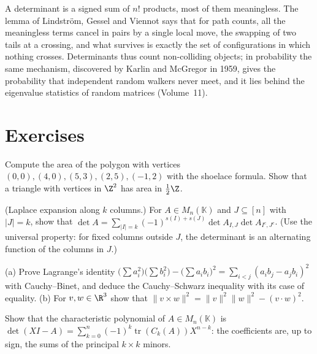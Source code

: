 \begin{beauty}
A determinant is a signed sum of $n!$ products, most of them meaningless. The lemma of Lindstr\"om, Gessel and Viennot
says that for path counts, all the meaningless terms cancel in pairs by a single local move, the swapping of two tails at
a crossing, and what survives is exactly the set of configurations in which nothing crosses. Determinants thus count
non-colliding objects; in probability the same mechanism, discovered by Karlin and McGregor in 1959, gives the
probability that independent random walkers never meet, and it lies behind the eigenvalue statistics of random
matrices (Volume~11).
\end{beauty}

\section{Exercises}

\begin{exercise}[$\star$]\label{linear:ex:latticetriangle}
Compute the area of the polygon with vertices $(0,0),(4,0),(5,3),(2,5),(-1,2)$ with the shoelace formula. Show that a
triangle with vertices in $\Z^2$ has area in $\frac12\Z$.
\end{exercise}

\begin{exercise}[$\star$]\label{linear:ex:laplace}
(Laplace expansion along $k$ columns.) For $A\in M_n(\mathbb K)$ and $J\subseteq[n]$ with $|J|=k$, show that
$\det A=\sum_{|I|=k}(-1)^{s(I)+s(J)}\det A_{I,J}\det A_{I^c,J^c}$. (Use the universal property: for fixed columns outside $J$,
the determinant is an alternating function of the columns in $J$.)
\end{exercise}

\begin{exercise}[$\star\star$]\label{linear:ex:lagrangeid}
(a) Prove Lagrange's identity $\bigl(\sum a_i^2\bigr)\bigl(\sum b_i^2\bigr)-\bigl(\sum a_ib_i\bigr)^2=\sum_{i<j}(a_ib_j-a_jb_i)^2$
with Cauchy--Binet, and deduce the Cauchy--Schwarz inequality with its case of equality. (b) For $v,w\in\R^3$ show that
$\|v\times w\|^2=\|v\|^2\|w\|^2-(v\cdot w)^2$.
\end{exercise}

\begin{exercise}[$\star\star$]\label{linear:ex:charpoly}
Show that the characteristic polynomial of $A\in M_n(\mathbb K)$ is $\det(XI-A)=\sum_{k=0}^n(-1)^k\operatorname{tr}(C_k(A))X^{n-k}$:
the coefficients are, up to sign, the sums of the principal $k\times k$ minors.
\end{exercise}

